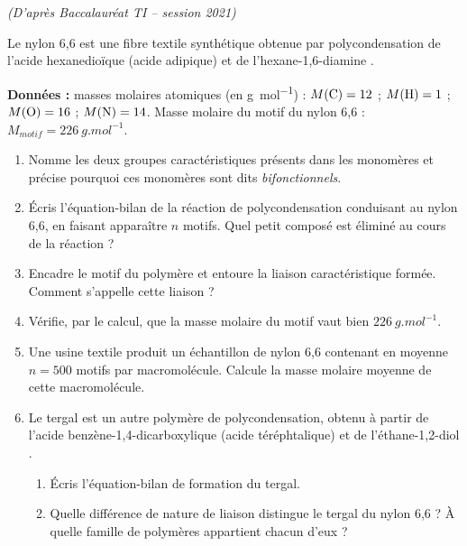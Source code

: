 \documentclass[11pt]{article}
\begin{document}
\begin{exercice}
\textit{(D'après Baccalauréat TI -- session 2021)}

Le nylon 6,6 est une fibre textile synthétique obtenue par polycondensation de l'acide hexanedioïque (acide adipique)  et de l'hexane-1,6-diamine .

\textbf{Données :} masses molaires atomiques (en \si{g.mol^{-1}}) : $M(\ce{C}) = 12$ ; $M(\ce{H}) = 1$ ; $M(\ce{O}) = 16$ ; $M(\ce{N}) = 14$. Masse molaire du motif du nylon 6,6 : $M_{motif} = \SI{226}{g.mol^{-1}}$.

\begin{enumerate}
\item Nomme les deux groupes caractéristiques présents dans les monomères et précise pourquoi ces monomères sont dits \emph{bifonctionnels}.
\item Écris l'équation-bilan de la réaction de polycondensation conduisant au nylon 6,6, en faisant apparaître $n$ motifs. Quel petit composé est éliminé au cours de la réaction ?
\item Encadre le motif du polymère et entoure la liaison caractéristique formée. Comment s'appelle cette liaison ?
\item Vérifie, par le calcul, que la masse molaire du motif vaut bien $\SI{226}{g.mol^{-1}}$.
\item Une usine textile produit un échantillon de nylon 6,6 contenant en moyenne $n = 500$ motifs par macromolécule. Calcule la masse molaire moyenne de cette macromolécule.
\item Le tergal est un autre polymère de polycondensation, obtenu à partir de l'acide benzène-1,4-dicarboxylique (acide téréphtalique)  et de l'éthane-1,2-diol .
\begin{enumerate}
\item Écris l'équation-bilan de formation du tergal.
\item Quelle différence de nature de liaison distingue le tergal du nylon 6,6 ? À quelle famille de polymères appartient chacun d'eux ?
\end{enumerate}
\end{enumerate}
\end{exercice}
\end{document}
